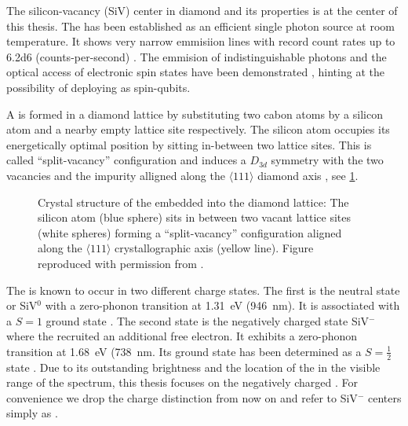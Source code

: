   The silicon-vacancy (SiV) center in diamond and its properties is at the center of this thesis. The \siv has been established as an efficient single photon source at room temperature. It shows very narrow emmisiion lines with record count rates up to \SI{6.2d6}{\cps} (counts-per-second) \cite{Neu2012a}. The emmision of indistinguishable photons and the optical access of electronic spin states have been demonstrated \cite{Sipahigil2014, Mueller2014, Pingault2014, Rogers2014a}, hinting at the possibility of deploying \sivs as spin-qubits.

  A \sivc is formed in a diamond lattice by substituting two cabon atoms by a silicon atom and a nearby empty lattice site respectively. The silicon atom occupies its energetically optimal position by sitting in-between two lattice sites. This is called ``split-vacancy'' configuration and induces a $D_{3d}$ symmetry with the two vacancies and the impurity alligned along the $\langle 111 \rangle$ diamond axis \cite{janine:222}, see \cref{fig::siv_lattice}.

  \begin{figure}[htbp]
		\centering
		\caption[Split-vacancy configuration for \sivs in diamond]{Crystal structure of the \siv embedded into the diamond lattice: The silicon atom (blue sphere) sits in between two vacant lattice sites (white spheres) forming a ``split-vacancy'' configuration aligned along the $\langle 111 \rangle$ crystallographic axis (yellow line). Figure reproduced with permission from \cite{Riedrich-moller2014}.}
		\label{fig::siv_lattice}
	\end{figure}


  The \siv is known to occur in two different charge states. The first is the neutral state or SiV$^0$ with a zero-phonon transition at \SI{1.31}{\eV} (\SI{946}{\nm}). It is assoctiated with a $S = 1$ ground state \cite{DHaenens-Johansson2011}. The second state is the negatively charged state SiV$^{-}$ where the \sivc recruited an additional free electron. It exhibits a zero-phonon transition at \SI{1.68}{\eV} (\SI{738}{\nm}. Its ground state has been determined as a $S = \frac{1}{2}$ state \cite{Goss2007, Hepp2014}. Due to its outstanding brightness and the location of the \zpl in the visible range of the spectrum, this thesis focuses on the negatively charged \siv. For convenience we drop the charge distinction from now on and refer to SiV$^{-}$ centers simply as \sivs.

